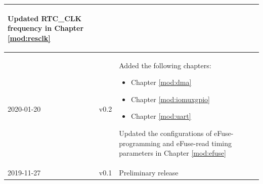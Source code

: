 \begin{longtable}[l]{ | m{2cm} | m{1.5cm} | m{12cm} | }
\begin{itemize}
    \textit{\nameref{mod:hmac}}
    \end{itemize}
    Updated RTC\_CLK frequency in Chapter \ref{mod:resclk} \textit{\nameref{mod:resclk}}
    \\\hline
    2020-01-20&v0.2&
    Added the following chapters:
    \begin{itemize}
    \item Chapter \ref{mod:dma} \textit{\nameref{mod:dma}}
    \item Chapter \ref{mod:iomuxgpio} \textit{\nameref{mod:iomuxgpio}}
    \item Chapter \ref{mod:uart} \textit{\nameref{mod:uart}}
    \end{itemize}
    Updated the configurations of eFuse-programming and eFuse-read timing parameters in Chapter \ref{mod:efuse} \textit{\nameref{mod:efuse}}
    \\\hline
    2019-11-27 & v0.1 & Preliminary release
    \\\hline
\end{longtable}
